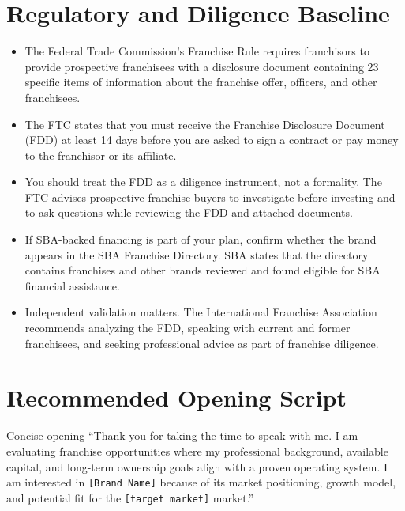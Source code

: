 \documentclass[11pt]{article}
\newcommand{\placeholder}[1]{\textcolor{accent}{\texttt{[#1]}}}
\begin{document}
\section{Regulatory and Diligence Baseline}

\begin{itemize}
  \item The Federal Trade Commission's Franchise Rule requires franchisors to provide prospective franchisees with a disclosure document containing 23 specific items of information about the franchise offer, officers, and other franchisees.\cite{ftc-rule}
  \item The FTC states that you must receive the Franchise Disclosure Document (FDD) at least 14 days before you are asked to sign a contract or pay money to the franchisor or its affiliate.\cite{ftc-consumer-guide,ftc-deep-dive}
  \item You should treat the FDD as a diligence instrument, not a formality. The FTC advises prospective franchise buyers to investigate before investing and to ask questions while reviewing the FDD and attached documents.\cite{ftc-consumer-guide,ftc-deep-dive}
  \item If SBA-backed financing is part of your plan, confirm whether the brand appears in the SBA Franchise Directory. SBA states that the directory contains franchises and other brands reviewed and found eligible for SBA financial assistance.\cite{sba-directory}
  \item Independent validation matters. The International Franchise Association recommends analyzing the FDD, speaking with current and former franchisees, and seeking professional advice as part of franchise diligence.\cite{ifa-diligence}
\end{itemize}

\section{Recommended Opening Script}

\begin{scriptbox}{Concise opening}
``Thank you for taking the time to speak with me. I am evaluating franchise opportunities where my professional background, available capital, and long-term ownership goals align with a proven operating system. I am interested in \placeholder{Brand Name} because of its market positioning, growth model, and potential fit for the \placeholder{target market} market.''
\end{scriptbox}
\end{document}

